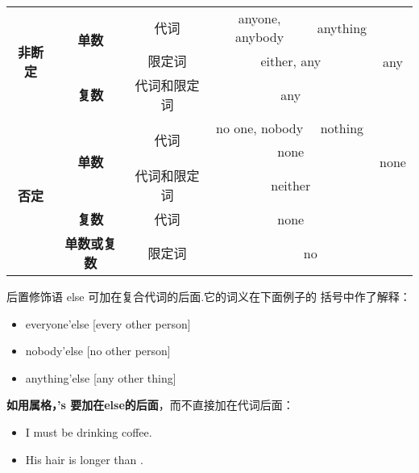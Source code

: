 \begin{table}[hbtp]
{\begin{tabular}{|c|c|c|ccc|}
\multirow{3}{*}{\textbf{非断定}} & \multirow{2}{*}{\textbf{单数}} & 代词                  & \multicolumn{1}{c|}{anyone, anybody}  & \multicolumn{1}{c|}{anything}  & \multirow{3}{*}{any}  \\ \cline{3-5}
                     &                     & 限定词                 & \multicolumn{2}{c|}{either, any}                                        &                       \\ \cline{2-5}
                     & \textbf{复数}                  & 代词和限定词              & \multicolumn{2}{c|}{any}                                              &                       \\ \hline
\multirow{5}{*}{\textbf{否定}} &
  \multirow{3}{*}{\textbf{单数}} &
  \multirow{2}{*}{代词} &
  \multicolumn{1}{c|}{no one, nobody} &
  \multicolumn{1}{c|}{nothing} &
  \multirow{3}{*}{none} \\ \cline{4-5}
                     &                     &                     & \multicolumn{2}{c|}{none}                                             &                       \\ \cline{3-5}
                     &                     & 代词和限定词              & \multicolumn{2}{c|}{neither}                                          &                       \\ \cline{2-6}
                     & \textbf{复数}                  & 代词                  & \multicolumn{2}{c|}{none}                                             &                       \\ \cline{2-6}
                     & \textbf{单数或复数}               & 限定词                 & \multicolumn{3}{c|}{no}                                                                       \\ \hline
\end{tabular}%
}
\end{table}

后置修饰语 else 可加在复合代词的后面.它的词义在下面例子的
括号中作了解释：
\begin{itemize}
\item everyone'else [every other person]
\item nobody'else [no other person]
\item anything'else [any other thing]
\end{itemize}

\textbf{如用属格，'s 要加在else的后面}，而不直接加在代词后面：
\begin{itemize}
\item I must be drinking  coffee.
\item His hair is longer than .
\end{itemize}

